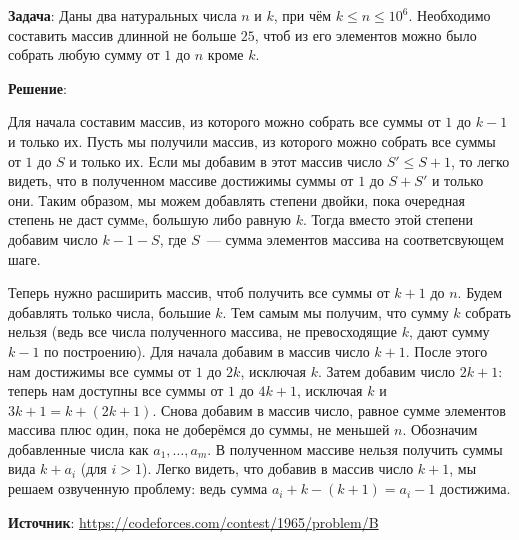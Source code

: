 \documentclass{article} %
\begin{document}
\textbf{Задача}: Даны два натуральных числа $n$ и $k$, при чём $k \leqslant n \leqslant 10^6$. Необходимо составить массив длинной не больше $25$, чтоб из его элементов можно было собрать любую сумму от $1$ до $n$ кроме $k$.

\clearpage

\textbf{Решение}: 

Для начала составим массив, из которого можно собрать все суммы от $1$ до $k-1$ и только их. Пусть мы получили массив, из которого можно собрать все суммы от $1$ до $S$ и только их. Если мы добавим в этот массив число $S' \leqslant S + 1$, то легко видеть, что в полученном массиве достижимы суммы от $1$ до $S + S'$ и только они. Таким образом, мы можем добавлять степени двойки, пока очередная степень не даст суммe, большую либо равную $k$. Тогда вместо этой степени добавим число $k - 1 - S$, где $S$~--- сумма элементов массива на соответсвующем шаге.

Теперь нужно расширить массив, чтоб получить все суммы от $k+1$ до $n$. Будем добавлять только числа, большие $k$. Тем самым мы получим, что сумму $k$ собрать нельзя (ведь все числа полученного массива, не превосходящие $k$, дают сумму $k-1$ по построению). Для начала добавим в массив число $k+1$. После этого нам достижимы все суммы от $1$ до $2k$, исключая $k$. Затем добавим число $2k+1$: теперь нам доступны все суммы от $1$ до $4k + 1$, исключая $k$ и $3k+1=k + (2k + 1)$. Снова добавим в массив число, равное сумме элементов массива плюс один, пока не доберёмся до суммы, не меньшей $n$. Обозначим добавленные числа как $a_1, \ldots, a_m$. В полученном массиве нельзя получить суммы вида $k + a_i$ (для $i > 1$). Легко видеть, что добавив в массив число $k+1$, мы решаем озвученную проблему: ведь сумма $a_i + k - (k + 1) = a_i - 1$ достижима.



\textbf{Источник}: \url{https://codeforces.com/contest/1965/problem/B}
\end{document}
